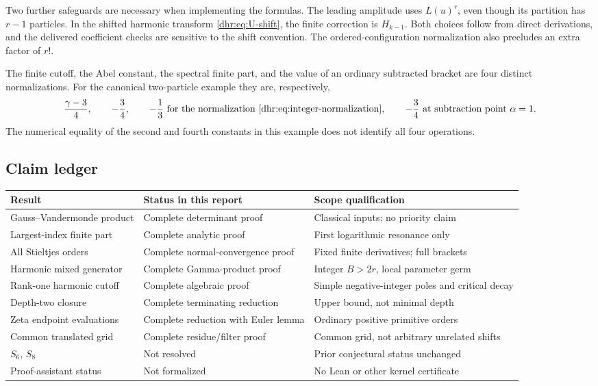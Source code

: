 Two further safeguards are necessary when implementing the formulas.
The leading amplitude uses $L(u)^r$, even though its partition has
$r-1$ particles. In the shifted harmonic transform
\eqref{dhr:eq:U-shift}, the finite correction is $H_{k-1}$.
Both choices follow from direct derivations, and the delivered
coefficient checks are sensitive to the shift convention. The
ordered-configuration normalization also precludes an extra factor
of $r!$.

The finite cutoff, the Abel constant, the spectral finite part, and the
value of an ordinary subtracted bracket are four distinct normalizations.
For the canonical two-particle example they are, respectively,
\[
 \frac{\gamma-3}{4},\qquad -\frac34,\qquad
 -\frac13\ \text{for the normalization \eqref{dhr:eq:integer-normalization}},
 \qquad -\frac34\ \text{at subtraction point }\alpha=1.
\]
The numerical equality of the second and fourth constants in this
example does not identify all four operations.

\subsection{Claim ledger}
\begin{center}
\small
\begin{tabular}{>{\raggedright\arraybackslash}p{}>{\raggedright\arraybackslash}p{}>{\raggedright\arraybackslash}p{}}
\toprule
Result & Status in this report & Scope qualification\\
\midrule
Gauss--Vandermonde product & Complete determinant proof & Classical inputs; no priority claim\\
Largest-index finite part & Complete analytic proof & First logarithmic resonance only\\
All Stieltjes orders & Complete normal-convergence proof & Fixed finite derivatives; full brackets\\
Harmonic mixed generator & Complete Gamma-product proof & Integer $B>2r$, local parameter germ\\
Rank-one harmonic cutoff & Complete algebraic proof & Simple negative-integer poles and critical decay\\
Depth-two closure & Complete terminating reduction & Upper bound, not minimal depth\\
Zeta endpoint evaluations & Complete reduction with Euler lemma & Ordinary positive primitive orders\\
Common translated grid & Complete residue/filter proof & Common grid, not arbitrary unrelated shifts\\
$S_6$, $S_8$ & Not resolved & Prior conjectural status unchanged\\
Proof-assistant status & Not formalized & No Lean or other kernel certificate\\
\bottomrule
\end{tabular}
\end{center}


